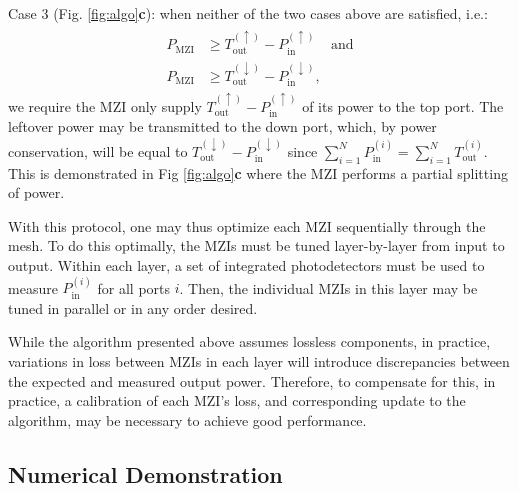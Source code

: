 Case 3 (Fig. \ref{fig:algo}\textbf{c}):  when neither of the two cases above are satisfied, i.e.:
\begin{align}
\begin{split}
    P_\textrm{MZI} &\geq T_\textrm{out}^{(\uparrow)} -  P_\textrm{in}^{(\uparrow)} ~~~~~\textrm{and} \\
    P_\textrm{MZI} &\geq T_\textrm{out}^{(\downarrow)} - P_\textrm{in}^{(\downarrow)},
\end{split}
\end{align}
we require the MZI only supply $T_\textrm{out}^{(\uparrow)} - P_\textrm{in}^{(\uparrow)}$ of its power to the top port.  The leftover power may be transmitted to the down port, which, by power conservation, will be equal to $T_\textrm{out}^{(\downarrow)} - P_\textrm{in}^{(\downarrow)}$ since $\sum_{i=1}^{N}P_\textrm{in}^{(i)} = \sum_{i=1}^{N}T_\textrm{out}^{(i)}$.  This is demonstrated in Fig \ref{fig:algo}\textbf{c} where the MZI performs a partial splitting of power.

With this protocol, one may thus optimize each MZI sequentially through the mesh.  To do this optimally, the MZIs must be tuned layer-by-layer from input to output.  Within each layer, a set of integrated photodetectors must be used to measure $P_\textrm{in}^{(i)}$ for all ports $i$.  Then, the individual MZIs in this layer may be tuned in parallel or in any order desired.

While the algorithm presented above assumes lossless components, in practice, variations in loss between MZIs in each layer will introduce discrepancies between the expected and measured output power.  Therefore, to compensate for this, in practice, a calibration of each MZI’s loss, and corresponding update to the algorithm, may be necessary to achieve good performance.

\subsection{\label{sec:demo}Numerical Demonstration}

